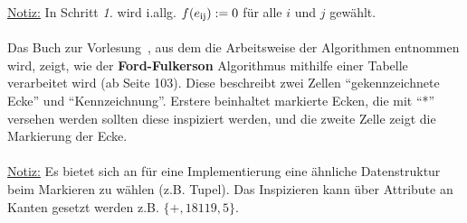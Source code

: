 \documentclass[11pt]{article}
\begin{document}
    \underline{Notiz:} In Schritt \textit{1.} wird i.allg. $f(e\textsubscript{ij}) := 0$ f\"ur alle $i$ und $j$ gew\"ahlt.\\~\\
    Das Buch zur Vorlesung~\cite{grbuch}, aus dem die Arbeitsweise der Algorithmen entnommen wird, zeigt, wie der \textbf{Ford-Fulkerson} Algorithmus mithilfe einer Tabelle verarbeitet wird (ab Seite 103). Diese beschreibt zwei Zellen "`gekennzeichnete Ecke"' und "`Kennzeichnung"'. Erstere beinhaltet markierte Ecken, die mit "`*"' versehen werden sollten diese inspiziert werden, und die zweite Zelle zeigt die Markierung der Ecke.\\~\\
    \underline{Notiz:} Es bietet sich an f\"ur eine Implementierung eine \"ahnliche Datenstruktur beim Markieren zu w\"ahlen (z.B. Tupel). Das Inspizieren kann \"uber Attribute an Kanten gesetzt werden z.B. $\{+,18119,5\}$.
\end{document}
